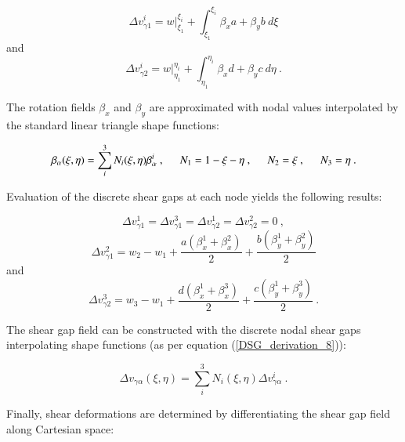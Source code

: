\begin{equation} 
\Delta v_{\gamma1}^i 
= w |_{\xi_1}^{\xi_i} +  \int_{\xi_1}^{\xi_i} \beta_x a +  \beta_y b \ d\xi
\label{DSG_derivation_6}
\end{equation}
and
\begin{equation} 
\Delta v_{\gamma2}^i 
= w |_{\eta_1}^{\eta_i} +  \int_{\eta_1}^{\eta_i} \beta_x d +  \beta_y c \ d\eta
\label{DSG_derivation_7}\ .
\end{equation}

The rotation fields $\beta_x$ and $\beta_y$ are approximated with nodal values interpolated by the standard linear triangle shape functions:

\begin{equation} 
\beta_\alpha (\xi,\eta)
= \sum_i^3 N_i (\xi,\eta) \beta_\alpha^i
\ ,
\hspace{5mm}
N_1 = 1-\xi-\eta\ ,
\hspace{5mm}
N_2 = \xi\ ,
\hspace{5mm}
N_3 = \eta
\label{DSG_derivation_8}\ .
\end{equation}

Evaluation of the discrete shear gaps at each node yields the following results:

\begin{equation} 
\Delta v_{\gamma1}^1 = 
\Delta v_{\gamma1}^3 = 
\Delta v_{\gamma2}^1 = 
\Delta v_{\gamma2}^2 = 0
\label{DSG_derivation_9}\ ,
\end{equation}
\begin{equation} 
\Delta v_{\gamma1}^2 = 
w_2 - w_1 + \frac{a(\beta_x^1 + \beta_x^2)}{2} + \frac{b(\beta_y^1 + \beta_y^2)}{2}
\label{DSG_derivation_10}
\end{equation}
and
\begin{equation} 
\Delta v_{\gamma2}^3 = 
w_3 - w_1 + \frac{d(\beta_x^1 + \beta_x^3)}{2} + \frac{c(\beta_y^1 + \beta_y^3)}{2}
\label{DSG_derivation_11}\ .
\end{equation}

The shear gap field can be constructed with the discrete nodal shear gaps interpolating shape functions (as per equation (\ref{DSG_derivation_8})):

\begin{equation} 
\Delta v_{\gamma \alpha} (\xi,\eta) 
= \sum_i^3 N_i (\xi,\eta) \Delta v_{\gamma \alpha}^i
\label{DSG_derivation_12}\ .
\end{equation}

Finally, shear deformations are determined by differentiating the shear gap field along Cartesian space:

